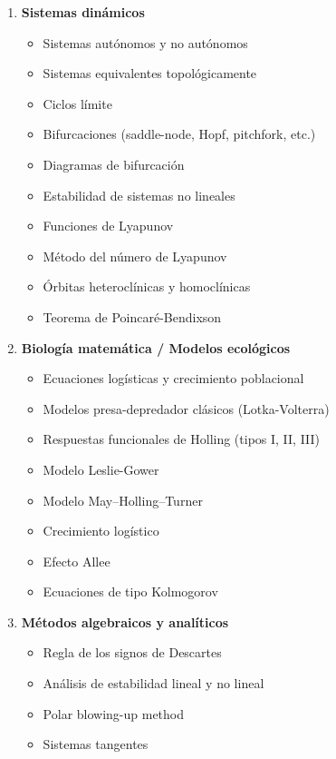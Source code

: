 \begin{enumerate}
    	\item \textbf{Sistemas dinámicos}
    	\begin{itemize}
    		\item Sistemas autónomos y no autónomos \checkmark
    		\item Sistemas equivalentes topológicamente
    		\item Ciclos límite
    		\item Bifurcaciones (saddle-node, Hopf, pitchfork, etc.)
    		\item Diagramas de bifurcación
    		\item Estabilidad de sistemas no lineales
    		\item Funciones de Lyapunov
    		\item Método del número de Lyapunov
    		\item Órbitas heteroclínicas y homoclínicas
    		\item Teorema de Poincaré-Bendixson
    	\end{itemize}
    	
    	\item \textbf{Biología matemática / Modelos ecológicos}
    	\begin{itemize}
    		\item Ecuaciones logísticas y crecimiento poblacional
    		\item Modelos presa-depredador clásicos (Lotka-Volterra)
    		\item Respuestas funcionales de Holling (tipos I, II, III)
    		\item Modelo Leslie-Gower
    		\item Modelo May–Holling–Turner
    		\item Crecimiento logístico
    		\item Efecto Allee
    		\item Ecuaciones de tipo Kolmogorov
    	\end{itemize}
    	
    	\item \textbf{Métodos algebraicos y analíticos}
    	\begin{itemize}
    		\item Regla de los signos de Descartes
    		\item Análisis de estabilidad lineal y no lineal
    		\item Polar blowing-up method
    		\item Sistemas tangentes
    	\end{itemize}
    \end{enumerate}
   
